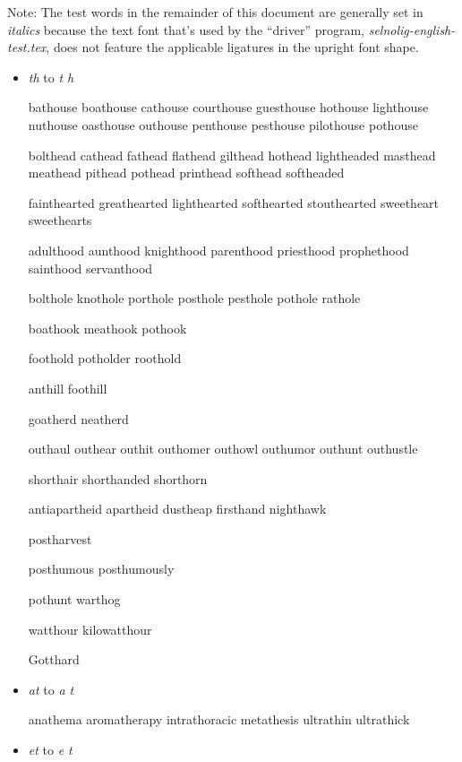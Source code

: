 \bigskip

Note: The test words in the remainder of this document are generally set in \emph{italics} because the text font that's used by the ``driver'' program, \emph{selnolig-english-test.tex}, does not feature the applicable ligatures in the upright font shape.


\begin{itemize}

\item \emph{th} to \emph{t\kern0pt h}

\bgroup \em

bathouse boathouse cathouse courthouse guesthouse hothouse lighthouse nuthouse oasthouse outhouse penthouse pesthouse pilothouse pothouse

bolthead cathead fathead flathead gilthead hothead lightheaded masthead meathead pithead pothead printhead softhead softheaded

fainthearted greathearted lighthearted softhearted stouthearted sweetheart sweethearts

adulthood aunthood knighthood parenthood priesthood prophethood sainthood servanthood

bolthole knothole porthole posthole pesthole pothole rathole

boathook meathook pothook

foothold potholder roothold

anthill foothill

goatherd neatherd

outhaul outhear outhit outhomer outhowl outhumor outhunt outhustle

shorthair shorthanded shorthorn %

antiapartheid apartheid dustheap firsthand nighthawk

postharvest

posthumous posthumously 

pothunt warthog 

watthour kilowatthour

Gotthard




\egroup


\item \emph{at} to \emph{a\kern0pt t}

\bgroup \em

anathema aromatherapy intrathoracic metathesis ultrathin ultrathick 
\egroup

\item \emph{et} to \emph{e\kern0pt t}


\end{itemize}
